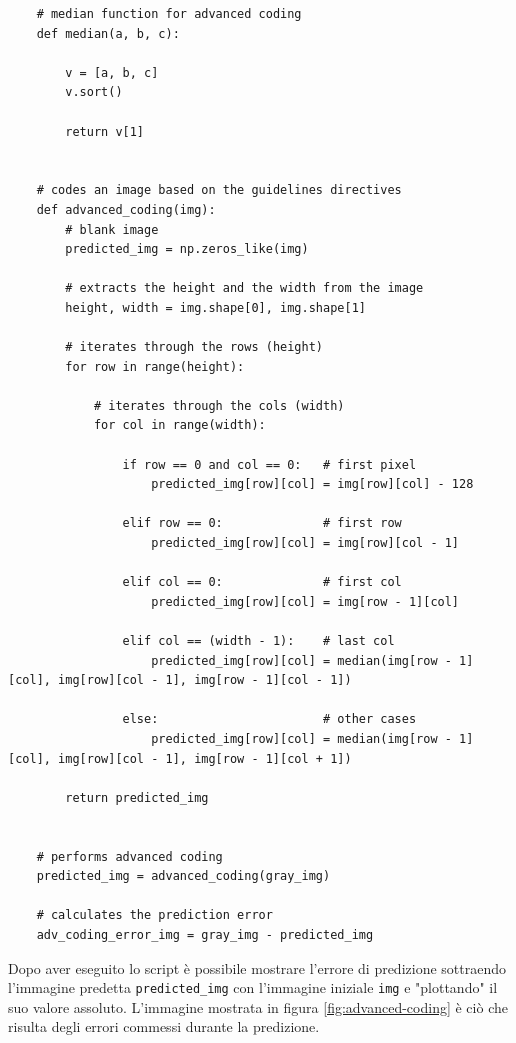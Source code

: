 \begin{lstlisting}
    # median function for advanced coding
    def median(a, b, c):
        
        v = [a, b, c]
        v.sort()
    
        return v[1]
    
    
    # codes an image based on the guidelines directives
    def advanced_coding(img):
        # blank image 
        predicted_img = np.zeros_like(img)
        
        # extracts the height and the width from the image
        height, width = img.shape[0], img.shape[1]
    
        # iterates through the rows (height)
        for row in range(height):
    
            # iterates through the cols (width)
            for col in range(width):
    
                if row == 0 and col == 0:   # first pixel
                    predicted_img[row][col] = img[row][col] - 128
                
                elif row == 0:              # first row
                    predicted_img[row][col] = img[row][col - 1]
                
                elif col == 0:              # first col
                    predicted_img[row][col] = img[row - 1][col]
                
                elif col == (width - 1):    # last col
                    predicted_img[row][col] = median(img[row - 1][col], img[row][col - 1], img[row - 1][col - 1])
    
                else:                       # other cases
                    predicted_img[row][col] = median(img[row - 1][col], img[row][col - 1], img[row - 1][col + 1])
    
        return predicted_img


    # performs advanced coding
    predicted_img = advanced_coding(gray_img)

    # calculates the prediction error
    adv_coding_error_img = gray_img - predicted_img
\end{lstlisting}

\noindent Dopo aver eseguito lo script è possibile mostrare l'errore di predizione sottraendo l'immagine predetta \texttt{predicted\_img} con l'immagine iniziale \texttt{img} e "plottando" il suo valore assoluto. L'immagine mostrata in figura \ref{fig:advanced-coding} è ciò che risulta degli errori commessi durante la predizione.

